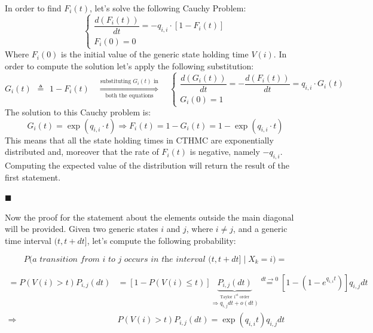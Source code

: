 \documentclass[12pt,a4paper]{article}
\begin{document}
\newpage
\noindent
In order to find $F_i(t)$, let's solve the following Cauchy Problem:
$$
\begin{cases}
\dfrac{d(F_i(t))}{dt}=-q_{i,i} \cdot [1-F_i(t)]\\
F_i(0)=0
\end{cases}
$$
Where $F_i(0)$ is the initial value of the generic state holding time $V(i)$. In order to compute the solution let's apply the following substitution:
$$
G_i(t)\hspace{5pt}\triangleq\hspace{5pt} 1-F_i(t)
\quad
\overset{\textrm{substituting }G_i(t) \textrm{ in}}
{\underset{\textrm{both the equations}}{\Rightarrow}}
\quad
\begin{cases}
\dfrac{d(G_i(t))}{dt}=-\dfrac{d(F_i(t))}{dt}=q_{i,i}\cdot G_i(t)\\
G_i(0)=1
\end{cases}
$$
The solution to this Cauchy problem is:
$$
G_i(t)=\exp(q_{i,i} \cdot t)
\Rightarrow
F_i(t)=1-G_i(t)=1-\exp(q_{i,i} \cdot t)
$$
This means that all the state holding times in CTHMC are exponentially distributed and, moreover that the rate of $F_i(t)$ is negative, namely $-q_{i,i}$. Computing the expected value of the distribution will return the result of the first statement.
\begin{flushright}
$\blacksquare$
\end{flushright}

\bigskip\noindent
Now the proof for the statement about the elements outside the main diagonal will be provided. Given two generic states $i$ and $j$, where $i\neq j$, and a generic time interval $(t, t+dt]$, let's compute the following probability:

\begin{equation}
\label{eq:qijtransition}
P\big(\textit{a transition from i to j occurs in the interval } (t, t+dt] \mid X_k=i\big)=
\end{equation}

\begin{align*}
=P\left( V(i)>t\right)
P_{i,j}(dt)
&=
\left[1-P\left( V(i)\leq t\right)\right]
\underbrace{P_{i,j}(dt)}_{
\overset{\textrm{Taylor }1^{\textrm{st}}\textrm{ order}}
{\Rightarrow q_{i,j}dt+o(dt)}}
\overset{dt\rightarrow 0}{=}
\left[1-\left(1-e^{q_{i,i} t}\right)\right]q_{i,j}dt
\\\Rightarrow&
P\left( V(i)>t\right)
P_{i,j}(dt)
=
\exp(q_{i,i} t)q_{i,j}dt
\end{align*}
\end{document}
